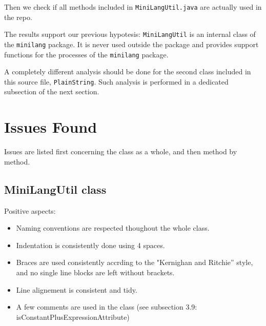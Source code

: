 \documentclass[11pt]{article} %
\begin{document}


Then we check if all methods included in \texttt{MiniLangUtil.java} are actually used in the repo.



The results support our previous hypotesis: \texttt{MiniLangUtil} is an internal class of the \texttt{minilang} package. It is never used outside the package and provides support functions for the processes of the \texttt{minilang} package.

A completely different analysis should be done for the second class included in this source file, \texttt{PlainString}. Such analysis is performed in a dedicated subsection of the next section.


\section{Issues Found}
Issues are listed first concerning the class as a whole, and then method by method.

\subsection{MiniLangUtil class}

Positive aspects:
\begin{itemize}[noitemsep]
	\item Naming conventions are respected thoughout the whole class.
	\item Indentation is consistently done using 4 spaces.
	\item Braces are used consistently accrding to the "Kernighan and Ritchie” style, and no single line blocks are left without brackets.
	\item Line alignement is consistent and tidy.
	\item A few comments are used in the class (see subsection 3.9: isConstantPlusExpressionAttribute)
\end{itemize}
\end{document}
